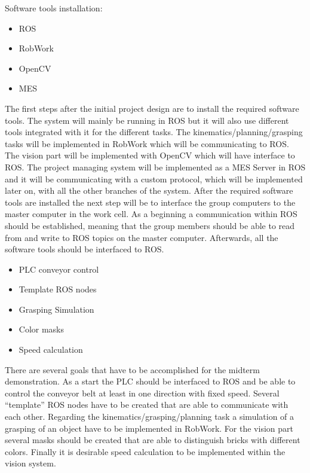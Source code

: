 Software tools installation:

\begin{itemize}
\item{ROS}
\item{RobWork}
\item{OpenCV}
\item{MES}
\end{itemize}

The first steps after the initial project design are to install the required software tools. The system will mainly be running in ROS but it will also use different tools integrated with it for the different tasks. The kinematics/planning/grasping tasks will be implemented in RobWork which will be communicating to ROS. The vision part will be implemented with OpenCV which will have interface to ROS. The project managing system will be implemented as a MES Server in ROS and it will be communicating with a custom protocol, which will be implemented later on, with all the other branches of the system. After the required software tools are installed the next step will be to interface the group computers to the master computer in the work cell. As a beginning a communication within ROS should be established, meaning that the group members should be able to read from and write to ROS topics on the master computer. Afterwards, all the software tools should be interfaced to ROS.

\begin{itemize}
\item{PLC conveyor control}
\item{Template ROS nodes}
\item{Grasping Simulation}
\item{Color masks}
\item{Speed calculation}
\end{itemize}

There are several goals that have to be accomplished for the midterm demonstration. As a start the PLC should be interfaced to ROS and be able to control the conveyor belt at least in one direction with fixed speed. Several “template” ROS nodes have to be created that are able to communicate with each other. Regarding the kinematics/grasping/planning task a simulation of a grasping of an object have to be implemented in RobWork. For the vision part several masks should be created that are able to distinguish bricks with different colors. Finally it is desirable speed calculation to be implemented within the vision system.
